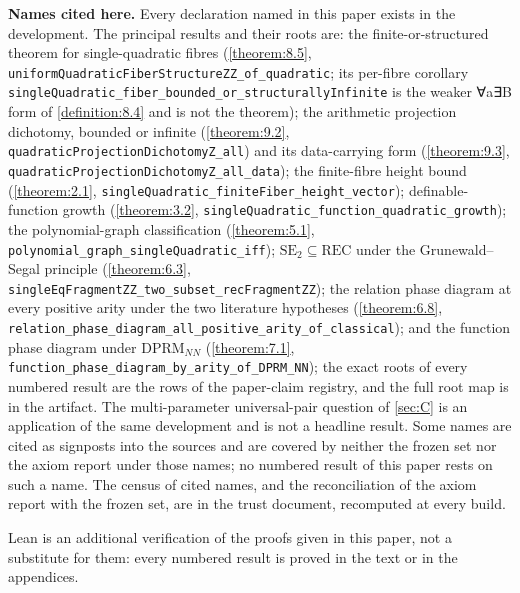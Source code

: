 \documentclass[11pt]{article}
\theoremstyle{plain}
\theoremstyle{definition}
\theoremstyle{remark}
\theoremstyle{plain}
\theoremstyle{definition}
\theoremstyle{remark}
\theoremstyle{plain}
\theoremstyle{definition}
\theoremstyle{remark}
\begin{document}
\textbf{Names cited here.} Every declaration named in this paper exists in the development. The principal results and their roots are: the finite-or-structured theorem for single-quadratic fibres (\cref{theorem:8.5}, \texttt{uniformQuadratic\allowbreak{}FiberStructureZZ\_\allowbreak{}of\_\allowbreak{}quadratic}; its per-fibre corollary \texttt{singleQuadratic\_\allowbreak{}fiber\_\allowbreak{}bounded\_\allowbreak{}or\_\allowbreak{}structurallyInfinite} is the weaker ∀a∃B form of \cref{definition:8.4} and is not the theorem); the arithmetic projection dichotomy, bounded or infinite (\cref{theorem:9.2}, \texttt{quadraticProjectionDichotomyZ\_\allowbreak{}all}) and its data-carrying form (\cref{theorem:9.3}, \texttt{quadraticProjectionDichotomyZ\_\allowbreak{}all\_\allowbreak{}data}); the finite-fibre height bound (\cref{theorem:2.1}, \texttt{singleQuadratic\_\allowbreak{}finiteFiber\_\allowbreak{}height\_\allowbreak{}vector}); definable-function growth (\cref{theorem:3.2}, \texttt{singleQuadratic\_\allowbreak{}function\_\allowbreak{}quadratic\_\allowbreak{}growth}); the polynomial-graph classification (\cref{theorem:5.1}, \texttt{polynomial\_\allowbreak{}graph\_\allowbreak{}singleQuadratic\_\allowbreak{}iff}); $\mathrm{SE}_{2} ⊆ \mathrm{REC}$ under the Grunewald–Segal principle (\cref{theorem:6.3}, \texttt{singleEqFragmentZZ\_\allowbreak{}two\_\allowbreak{}subset\_\allowbreak{}recFragmentZZ}); the relation phase diagram at every positive arity under the two literature hypotheses (\cref{theorem:6.8}, \texttt{relation\_\allowbreak{}phase\_\allowbreak{}diagram\_\allowbreak{}all\_\allowbreak{}positive\_\allowbreak{}arity\_\allowbreak{}of\_\allowbreak{}classical}); and the function phase diagram under $\mathrm{DPRM}_{NN}$ (\cref{theorem:7.1}, \texttt{function\_\allowbreak{}phase\_\allowbreak{}diagram\_\allowbreak{}by\_\allowbreak{}arity\_\allowbreak{}of\_\allowbreak{}DPRM\_\allowbreak{}NN}); the exact roots of every numbered result are the rows of the paper-claim registry, and the full root map is in the artifact. The multi-parameter universal-pair question of \cref{sec:C} is an application of the same development and is not a headline result. Some names are cited as signposts into the sources and are covered by neither the frozen set nor the axiom report under those names; no numbered result of this paper rests on such a name. The census of cited names, and the reconciliation of the axiom report with the frozen set, are in the trust document, recomputed at every build.

Lean is an additional verification of the proofs given in this paper, not a substitute for them: every numbered result is proved in the text or in the appendices.
\end{document}
